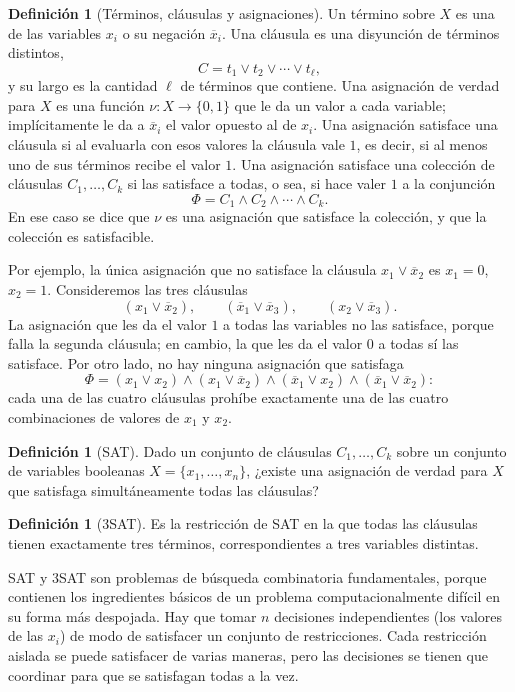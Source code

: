 \documentclass[12pt, spanish, oneside, openany]{book}
\newcommand{\nega}[1]{\overline{#1}} %
\theoremstyle{uprightplain}
\theoremstyle{definition}
\newtheorem{definicion}[teorema]{Definición}
\theoremstyle{remark}
\theoremstyle{definition}
\begin{document}
\begin{definicion}[Términos, cláusulas y asignaciones]
\label{def:np-clausula}
Un término sobre $X$ es una de las variables $x_i$ o su negación $\nega{x}_i$. Una cláusula es una disyunción de términos distintos,
\[
C=t_1\vee t_2\vee\cdots\vee t_\ell,
\]
y su largo es la cantidad $\ell$ de términos que contiene. Una asignación de verdad para $X$ es una función $\nu:X\to\{0,1\}$ que le da un valor a cada variable; implícitamente le da a $\nega{x}_i$ el valor opuesto al de $x_i$. Una asignación satisface una cláusula si al evaluarla con esos valores la cláusula vale $1$, es decir, si al menos uno de sus términos recibe el valor $1$. Una asignación satisface una colección de cláusulas $C_1,\dots,C_k$ si las satisface a todas, o sea, si hace valer $1$ a la conjunción
\[
\Phi=C_1\wedge C_2\wedge\cdots\wedge C_k .
\]
En ese caso se dice que $\nu$ es una asignación que satisface la colección, y que la colección es satisfacible.
\end{definicion}

Por ejemplo, la única asignación que no satisface la cláusula $x_1\vee\nega{x}_2$ es $x_1=0$, $x_2=1$. Consideremos las tres cláusulas
\[
(x_1\vee\nega{x}_2),\qquad(\nega{x}_1\vee\nega{x}_3),\qquad(x_2\vee\nega{x}_3).
\]
La asignación que les da el valor $1$ a todas las variables no las satisface, porque falla la segunda cláusula; en cambio, la que les da el valor $0$ a todas sí las satisface. Por otro lado, no hay ninguna asignación que satisfaga
\[
\Phi=(x_1\vee x_2)\wedge(x_1\vee\nega{x}_2)\wedge(\nega{x}_1\vee x_2)\wedge(\nega{x}_1\vee\nega{x}_2):
\]
cada una de las cuatro cláusulas prohíbe exactamente una de las cuatro combinaciones de valores de $x_1$ y $x_2$.

\begin{definicion}[SAT]
\label{def:np-sat}
Dado un conjunto de cláusulas $C_1,\dots,C_k$ sobre un conjunto de variables booleanas $X=\{x_1,\dots,x_n\}$, ¿existe una asignación de verdad para $X$ que satisfaga simultáneamente todas las cláusulas?
\end{definicion}

\begin{definicion}[3SAT]
\label{def:np-3sat}
Es la restricción de SAT en la que todas las cláusulas tienen exactamente tres términos, correspondientes a tres variables distintas.
\end{definicion}

SAT y 3SAT son problemas de búsqueda combinatoria fundamentales, porque contienen los ingredientes básicos de un problema computacionalmente difícil en su forma más despojada. Hay que tomar $n$ decisiones independientes (los valores de las $x_i$) de modo de satisfacer un conjunto de restricciones. Cada restricción aislada se puede satisfacer de varias maneras, pero las decisiones se tienen que coordinar para que se satisfagan todas a la vez.
\end{document}
